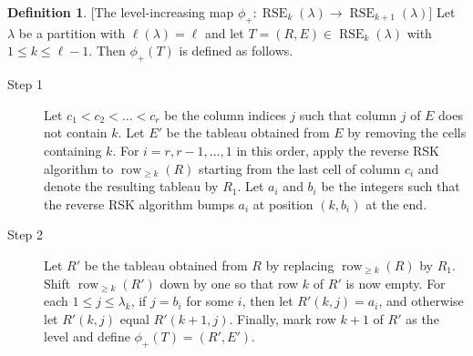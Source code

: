 \documentclass{amsart}
\numberwithin{equation}{section}
\theoremstyle{definition}
\newtheorem{defn}[thm]{Definition}
\newcommand\row{\operatorname{row}}
\newcommand\pd{\phi_+}
\newcommand\RSE{\operatorname{RSE}}
\begin{document}
\begin{defn} \label{def:pd}
[The level-increasing map $\pd:\RSE_{k}(\lambda)\to \RSE_{k+1}(\lambda)$]
  Let $\lambda$ be a partition with $\ell(\lambda)=\ell$ and let $T=(R,E)\in
  \RSE_{k}(\lambda)$ with $1\le k\le \ell-1$. Then $\pd(T)$ is defined as
  follows.
\begin{description}
\item[Step 1] Let $c_1<c_2<\dots<c_r$ be the column indices $j$ such that column
  $j$ of $E$ does not contain $k$. Let $E'$ be the tableau obtained from $E$ by
  removing the cells containing $k$. For $i=r,r-1,\dots,1$ in this order, apply
  the reverse RSK algorithm to $\row_{\ge k}(R)$ starting from the last cell of
  column $c_i$ and denote the resulting tableau by $R_1$. Let $a_i$ and $b_i$ be
  the integers such that the reverse RSK algorithm bumps $a_i$ at position
  $(k,b_i)$ at the end.
\item[Step 2] Let $R'$ be the tableau obtained from $R$ by replacing $\row_{\ge
    k}(R)$ by $R_1$. Shift $\row_{\ge k}(R')$ down by one so that row $k$ of
  $R'$ is now empty. For each $1\le j\le \lambda_{k}$, if $j=b_i$ for some $i$,
  then let $R'(k,j)=a_i$, and otherwise let $R'(k,j)$ equal $R'(k+1,j)$.
  Finally, mark row $k+1$ of $R'$ as the level and define $\pd(T)=(R',E')$.
\end{description}
\end{defn}
\end{document}
